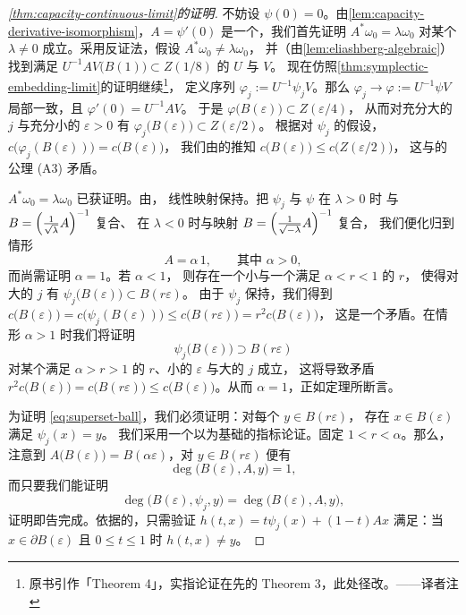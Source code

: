 \begin{proof}[\cref*{thm:capacity-continuous-limit}的证明]
不妨设 $\psi(0)=0$。由\cref{lem:capacity-derivative-isomorphism}，$A=\psi'(0)$%
是一个\trIsomorphism，我们首先证明 $A^{*}\omega_0=\lambda\omega_0$%
对某个 $\lambda\neq0$ 成立。采用反证法，假设 $A^{*}\omega_0\neq\lambda\omega_0$，%
并（由\cref{lem:eliashberg-algebraic}）找到满足%
$U^{-1}AV\bigl(B(1)\bigr)\subset Z(1/8)$ 的\trSymplecticMapping{} $U$ 与 $V$。%
现在仿照\cref{thm:symplectic-embedding-limit}的证明继续\footnote{原书引作「Theorem 4」，实指论证在先的 Theorem 3，此处径改。——译者注}，%
定义序列 $\varphi_j:=U^{-1}\psi_jV$。那么%
$\varphi_j\to\varphi:=U^{-1}\psi V$ 局部一致，且 $\varphi'(0)=U^{-1}AV$。%
于是 $\varphi\bigl(B(\varepsilon)\bigr)\subset Z(\varepsilon/4)$，%
从而对充分大的 $j$ 与充分小的 $\varepsilon>0$ 有%
$\varphi_j\bigl(B(\varepsilon)\bigr)\subset Z(\varepsilon/2)$。%
根据对 $\psi_j$ 的假设，$c\bigl(\varphi_j(B(\varepsilon))\bigr)=c\bigl(B(\varepsilon)\bigr)$，%
我们由\trCapacity{}的\trMonotonicity{}推知%
$c\bigl(B(\varepsilon)\bigr)\le c\bigl(Z(\varepsilon/2)\bigr)$，%
这与\trCapacity{}的公理 (A3) 矛盾。

$A^{*}\omega_0=\lambda\omega_0$ 已获证明。由\trConformality，%
线性\trAntisymplectic{}映射保持\trCapacity。把\trMapping{} $\psi_j$ 与 $\psi$ 在 $\lambda>0$ 时%
与\trSymplecticMapping{} $B=\Bigl(\frac{1}{\sqrt{\lambda}}A\Bigr)^{-1}$ 复合、%
在 $\lambda<0$ 时与\trAntisymplectic{}映射 $B=\Bigl(\frac{1}{\sqrt{-\lambda}}A\Bigr)^{-1}$ 复合，%
我们便化归到情形
\[
A=\alpha\,1,\qquad\text{其中 }\alpha>0,
\]
而尚需证明 $\alpha=1$。若 $\alpha<1$，%
则存在一个小\trBall{}与一个满足 $\alpha<r<1$ 的 $r$，%
使得对大的 $j$ 有 $\psi_j\bigl(B(\varepsilon)\bigr)\subset B(r\varepsilon)$。%
由于 $\psi_j$ 保持\trCapacity，我们得到%
$c\bigl(B(\varepsilon)\bigr)=c\bigl(\psi_j(B(\varepsilon))\bigr)
\le c\bigl(B(r\varepsilon)\bigr)=r^{2}c\bigl(B(\varepsilon)\bigr)$，%
这是一个矛盾。在情形 $\alpha>1$ 时我们将证明
\begin{equation}\label{eq:superset-ball}
\psi_j\bigl(B(\varepsilon)\bigr)\supset B(r\varepsilon)
\end{equation}
对某个满足 $\alpha>r>1$ 的 $r$、小的 $\varepsilon$ 与大的 $j$ 成立，%
这将导致矛盾 $r^{2}c\bigl(B(\varepsilon)\bigr)=c\bigl(B(r\varepsilon)\bigr)
\le c\bigl(B(\varepsilon)\bigr)$。从而 $\alpha=1$，正如定理所断言。

为证明 \eqref{eq:superset-ball}，我们必须证明：对每个 $y\in B(r\varepsilon)$，%
存在 $x\in B(\varepsilon)$ 满足 $\psi_j(x)=y$。%
我们采用一个以\trBrouwer\trMapping\trDegree{}为基础的指标论证。固定 $1<r<\alpha$。那么，%
注意到 $A\bigl(B(\varepsilon)\bigr)=B(\alpha\varepsilon)$，对 $y\in B(r\varepsilon)$ 便有
\[
\deg\bigl(B(\varepsilon),A,y\bigr)=1,
\]
而只要我们能证明
\[
\deg\bigl(B(\varepsilon),\psi_j,y\bigr)=\deg\bigl(B(\varepsilon),A,y\bigr),
\]
证明即告完成。依据\trDegree{}的\trHomotopy\trInvariance，只需验证\trHomotopy{}%
$h(t,x)=t\psi_j(x)+(1-t)Ax$ 满足：当 $x\in\partial B(\varepsilon)$%
且 $0\le t\le1$ 时 $h(t,x)\neq y$。


\end{proof}
